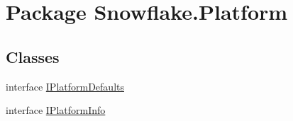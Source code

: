 \hypertarget{namespace_snowflake_1_1_platform}{}\section{Package Snowflake.\+Platform}
\label{namespace_snowflake_1_1_platform}
\subsection*{Classes}
\begin{DoxyCompactItemize}
\item 
interface \hyperlink{interface_snowflake_1_1_platform_1_1_i_platform_defaults}{I\+Platform\+Defaults}
\item 
interface \hyperlink{interface_snowflake_1_1_platform_1_1_i_platform_info}{I\+Platform\+Info}
\end{DoxyCompactItemize}
